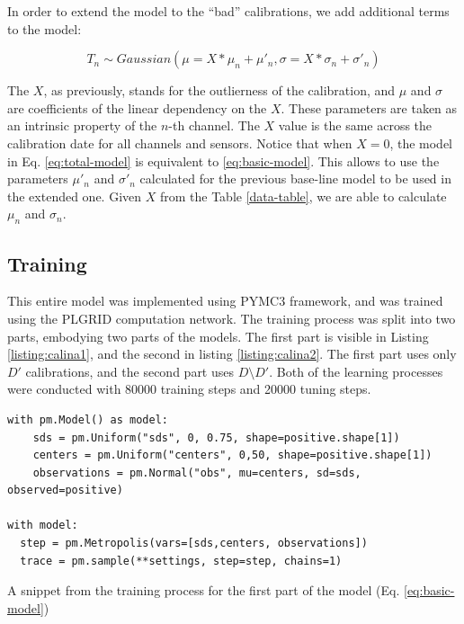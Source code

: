 In order to extend the model to the ``bad'' calibrations, we add additional terms to the model:

\begin{equation}
    \label{eq:total-model}
    T_n \sim Gaussian(\mu=X*\mu_n+\mu\prime_n, \sigma=X*\sigma_n+\sigma\prime_n)
\end{equation}

The $X$, as previously, stands for the outlierness of the calibration, and $\mu$ and $\sigma$ are coefficients of the linear dependency on the $X$.
These parameters are taken as an intrinsic property of the $n$-th channel.
The $X$ value is the same across the calibration date for all channels and sensors.
Notice that when $X=0$, the model in Eq. \ref{eq:total-model} is equivalent to \ref{eq:basic-model}.
This allows to use the parameters $\mu\prime_{n}$ and $\sigma\prime_{n}$ calculated for the previous base-line model to be used in the extended one.
Given $X$ from the Table \ref{data-table}, we are able to calculate $\mu_{n}$ and $\sigma_{n}$.

\subsection{Training}
This entire model was implemented using PYMC3\cite{Salvatier2016} framework, and was trained using the PLGRID computation network.
The training process was split into two parts, embodying two parts of the models.
The first part is visible in Listing \ref{listing:calina1}, and the second in listing \ref{listing:calina2}.
The first part uses only $D\prime$ calibrations, and the second part uses $D \setminus D\prime$.
Both of the learning processes were conducted with 80000 training steps and 20000 tuning steps.

\begin{listing}[!ht]
\begin{verbatim}
with pm.Model() as model:
    sds = pm.Uniform("sds", 0, 0.75, shape=positive.shape[1])
    centers = pm.Uniform("centers", 0,50, shape=positive.shape[1])
    observations = pm.Normal("obs", mu=centers, sd=sds, observed=positive)

with model:
  step = pm.Metropolis(vars=[sds,centers, observations])
  trace = pm.sample(**settings, step=step, chains=1)
\end{verbatim}
\caption{A snippet from the training process for the first part of the model (Eq. \ref{eq:basic-model})}
\label{listing:calina1}
\end{listing}

